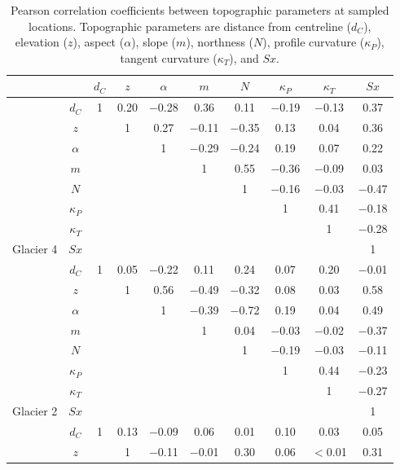 \documentclass[12pt]{article}
\newcommand{\params}{Topographic parameters are distance from centreline ($d_C$), elevation ($z$), aspect ($\alpha$), slope ($m$), northness ($N$), profile curvature ($\kappa_P$), tangent curvature ($\kappa_T$), and $Sx$.}
\begin{document}
\begin{table}[H]
\centering
\caption{Pearson correlation coefficients between topographic parameters at sampled locations. \params}
\label{tab:pearson_correlation}
\begin{tabular}{cc|cccccccc}
 &  & $d_C$ & $z$ & $\alpha$ & $m$ & $N$ & $\kappa_P$ & $\kappa_T$ & $Sx$ \\ \hline
 
 & $d_C$ & 1 & 0.20 &  $-$0.28 & 0.36 & 0.11 &  $-$0.19 &  $-$0.13 & 0.37 \\
 
 & $z$ & & 1 & 0.27 &  $-$0.11 &  $-$0.35 & 0.13 & 0.04 & 0.36 \\
 
 & $\alpha$ & & & 1 &  $-$0.29 &  $-$0.24 & 0.19 & 0.07 & 0.22 \\
 
 & $m$ & & & & 1 & 0.55 &  $-$0.36 &  $-$0.09 & 0.03 \\
 
 & $N$ & & & & & 1 &  $-$0.16 &  $-$0.03 &  $-$0.47 \\
 
 & $\kappa_P$ & & & & & & 1 & 0.41 &  $-$0.18 \\
 
 & $\kappa_T$ & & & & & & & 1 &  $-$0.28 \\
 
\multirow{ -8}{*}{Glacier 4} & $Sx$ & & & & & & & & 1 \\ \hline
 & $d_C$ & 1 & 0.05 &  $-$0.22 & 0.11 & 0.24 & 0.07 & 0.20 &  $-$0.01 \\
 & $z$ & & 1 & 0.56 &  $-$0.49 &  $-$0.32 & 0.08 & 0.03 & 0.58 \\
 & $\alpha$ & & & 1 &  $-$0.39 &  $-$0.72 & 0.19 & 0.04 & 0.49 \\
 & $m$ & & & & 1 & 0.04 &  $-$0.03 &  $-$0.02 &  $-$0.37 \\
 & $N$ & & & & & 1 &  $-$0.19 &  $-$0.03 &  $-$0.11 \\
 & $\kappa_P$ & & & & & & 1 & 0.44 &  $-$0.23 \\
 & $\kappa_T$ & & & & & & & 1 &  $-$0.27 \\
\multirow{ -8}{*}{Glacier 2} & $Sx$ & & & & & & & & 1 \\ \hline
 
 & $d_C$ & 1 & 0.13 &  $-$0.09 & 0.06 & 0.01 & 0.10 & 0.03 & 0.05 \\
 
 & $z$ & & 1 &  $-$0.11 &  $-$0.01 & 0.30 & 0.06 &  $<$0.01 & 0.31 \\
 

\end{tabular}
\end{table}
\end{document}
